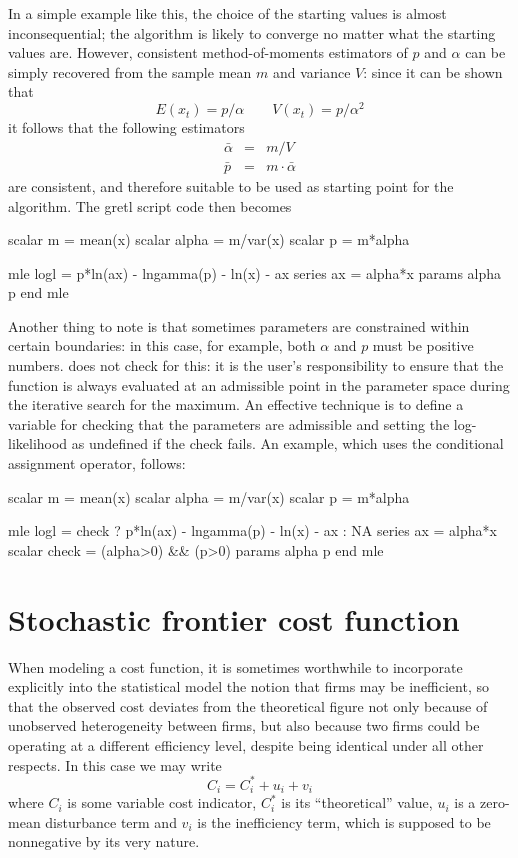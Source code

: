 In a simple example like this, the choice of the starting values is
almost inconsequential; the algorithm is likely to converge no
matter what the starting values are. However, consistent
method-of-moments estimators of $p$ and $\alpha$ can be simply
recovered from the sample mean $m$ and variance $V$: since it can be
shown that
\[
  E(x_t) = p/\alpha \qquad  V(x_t) = p/\alpha^2
\]
it follows that the following estimators 
\begin{eqnarray*}
  \bar{\alpha} & = &  m/V \\
  \bar{p} & = & m \cdot \bar{\alpha} 
\end{eqnarray*}
are consistent, and therefore suitable to be used as starting point
for the algorithm.  The gretl script code then becomes
\begin{code}
scalar m = mean(x)
scalar alpha = m/var(x)
scalar p = m*alpha

mle logl =  p*ln(ax) - lngamma(p) - ln(x) - ax 
  series ax = alpha*x
  params alpha p
end mle 
\end{code}

Another thing to note is that sometimes parameters are constrained
within certain boundaries: in this case, for example, both $\alpha$
and $p$ must be positive numbers.  does not check for this:
it is the user's responsibility to ensure that the function is
always evaluated at an admissible point in the parameter space during
the iterative search for the maximum. An effective technique is to
define a variable for checking that the parameters are admissible and
setting the log-likelihood as undefined if the check fails. An
example, which uses the conditional assignment operator, follows:
\begin{code}
scalar m = mean(x)
scalar alpha = m/var(x)
scalar p = m*alpha

mle logl = check ? p*ln(ax) - lngamma(p) - ln(x) - ax : NA
  series ax = alpha*x
  scalar check = (alpha>0) && (p>0)
  params alpha p
end mle 
\end{code}

\section{Stochastic frontier cost function}
\label{sec:frontier}

When modeling a cost function, it is sometimes worthwhile to
incorporate explicitly into the statistical model the notion that
firms may be inefficient, so that the observed cost deviates from the
theoretical figure not only because of unobserved heterogeneity
between firms, but also because two firms could be operating at a
different efficiency level, despite being identical under all other
respects. In this case we may write
\[
  C_i = C^*_i + u_i + v_i
\]
where $C_i$ is some variable cost indicator, $C_i^*$ is its
``theoretical'' value, $u_i$ is a zero-mean disturbance term and
$v_i$ is the inefficiency term, which is supposed to be nonnegative
by its very nature.

